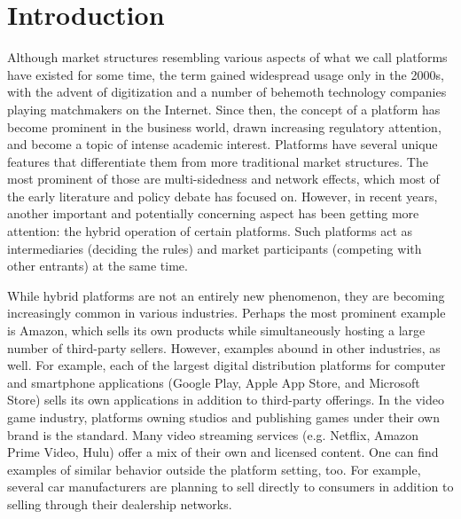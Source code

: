\section{Introduction}

Although market structures resembling various aspects of what we call platforms have existed for some time, the term gained widespread usage only in the 2000s, with the advent of digitization and a number of behemoth technology companies playing matchmakers on the Internet.
Since then, the concept of a platform has become prominent in the business world, drawn increasing regulatory attention, and become a topic of intense academic interest.
Platforms have several unique features that differentiate them from more traditional market structures.
The most prominent of those are multi-sidedness and network effects, which most of the early literature \parencite[for an overview, see][]{rochet2006two} and policy debate \parencite[e.g.][]{fletcher2021consumer,calvano2021market} has focused on.
However, in recent years, another important and potentially concerning aspect has been getting more attention: the hybrid operation of certain platforms.
Such platforms act as intermediaries (deciding the rules) and market participants (competing with other entrants) at the same time.

While hybrid platforms are not an entirely new phenomenon, they are becoming increasingly common in various industries.
Perhaps the most prominent example is Amazon, which sells its own products while simultaneously hosting a large number of third-party sellers.
However, examples abound in other industries, as well.
For example, each of the largest digital distribution platforms for computer and smartphone applications (Google Play, Apple App Store, and Microsoft Store) sells its own applications in addition to third-party offerings.
In the video game industry, platforms owning studios and publishing games under their own brand is the standard.
Many video streaming services (e.g. Netflix, Amazon Prime Video, Hulu) offer a mix of their own and licensed content.
One can find examples of similar behavior outside the platform setting, too.
For example, several car manufacturers are planning to sell directly to consumers in addition to selling through their dealership networks.

